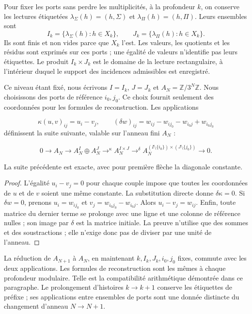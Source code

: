 Pour fixer les ports sans perdre les multiplicités, à la profondeur \(k\), on conserve les lectures étiquetées \(\lambda_\Sigma(h)=(h,\Sigma)\) et \(\lambda_\Pi(h)=(h,\Pi)\). Leurs ensembles sont
\[
I_k=\{\lambda_\Sigma(h):h\in X_k\},\qquad
J_k=\{\lambda_\Pi(h):h\in X_k\}.
\]
Ils sont finis et non vides parce que \(X_k\) l’est. Les valeurs, les quotients et les résidus sont exprimés sur ces ports ; une égalité de valeurs n’identifie pas leurs étiquettes. Le produit \(I_k\times J_k\) est le domaine de la lecture rectangulaire, à l’intérieur duquel le support des incidences admissibles est enregistré.

Ce niveau étant fixé, nous écrivons \(I=I_k\), \(J=J_k\) et \(A_N=\mathbb Z/3^N\mathbb Z\). Nous choisissons des ports de référence \(i_0,j_0\). Ce choix fournit seulement des coordonnées pour les formules de reconstruction. Les applications

\[
\kappa(u,v)_{ij}=u_i-v_j,
\qquad
(\delta w)_{ij}=w_{ij}-w_{ij_0}-w_{i_0j}+w_{i_0j_0}
\]
définissent la suite suivante, valable sur l'anneau fini \(A_N\) :

\[
0\longrightarrow A_N\longrightarrow
A_N^I\oplus A_N^J\mathrel{\mathop{\longrightarrow}^{\kappa}}
A_N^{I\times J}\mathrel{\mathop{\longrightarrow}^{\delta}}
A_N^{(I\setminus\{i_0\})\times(J\setminus\{j_0\})}
\longrightarrow0.
\]
\begin{proposition}
\label{iv:cont:rectangular-exacta}
La suite précédente est exacte, avec pour première flèche la diagonale constante.

\end{proposition}
\begin{proof}
L'égalité \(u_i-v_j=0\) pour chaque couple impose que toutes les coordonnées de \(u\) et de \(v\) soient une même constante. La substitution directe donne \(\delta\kappa=0\). Si \(\delta w=0\), prenons \(u_i=w_{ij_0}\) et \(v_j=w_{i_0j_0}-w_{i_0j}\). Alors \(u_i-v_j=w_{ij}\). Enfin, toute matrice du dernier terme se prolonge avec une ligne et une colonne de référence nulles ; son image par \(\delta\) est la matrice initiale. La preuve n'utilise que des sommes et des soustractions ; elle n'exige donc pas de diviser par une unité de l'anneau.
\end{proof}

La réduction de \(A_{N+1}\) à \(A_N\), en maintenant \(k,I_k,J_k,i_0,j_0\) fixes, commute avec les deux applications. Les formules de reconstruction sont les mêmes à chaque profondeur modulaire. Telle est la compatibilité arithmétique démontrée dans ce paragraphe. Le prolongement d’histoires \(k\to k+1\) conserve les étiquettes de préfixe ; ses applications entre ensembles de ports sont une donnée distincte du changement d’anneau \(N\to N+1\).

